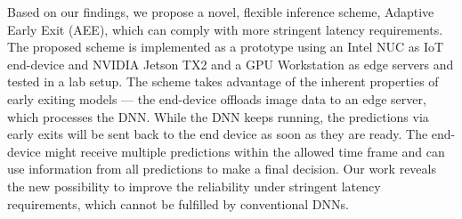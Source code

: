 \begin{justify}
\begin{small}
{{				Based on our findings, we propose a novel, flexible inference scheme, Adaptive Early Exit (AEE), which can comply with more stringent latency requirements. The proposed scheme is implemented as a prototype using an Intel NUC as IoT end-device and NVIDIA Jetson TX2 and a GPU Workstation as edge servers and tested in a lab setup. The scheme takes advantage of the inherent properties of early exiting models — the end-device offloads image data to an edge server, which processes the DNN. While the DNN keeps running, the predictions via early exits will be sent back to the end device as soon as they are ready. The end-device might receive multiple predictions within the allowed time frame and can use information from all predictions to make a final decision. Our work reveals the new possibility to improve the reliability under stringent latency requirements, which cannot be fulfilled by conventional DNNs. 
		}}
	\end{small}
\end{justify}